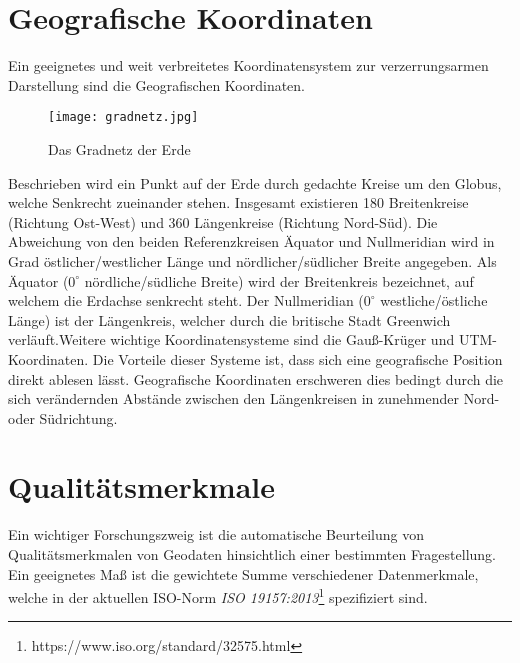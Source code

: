 \documentclass[11pt,fleqn]{book}
\begin{document}
\section{Geografische Koordinaten}
Ein geeignetes und weit verbreitetes Koordinatensystem zur verzerrungsarmen Darstellung sind die Geografischen Koordinaten. 

\begin{figure}[h]
\centering
\texttt{[image: gradnetz.jpg]}
\caption{Das Gradnetz der Erde}\label{gradnetz}
\end{figure}

Beschrieben wird ein Punkt auf der Erde durch gedachte Kreise um den Globus, welche Senkrecht zueinander stehen. Insgesamt existieren 180 Breitenkreise (Richtung Ost-West) und 360 Längenkreise (Richtung Nord-Süd). Die Abweichung von den beiden Referenzkreisen Äquator und Nullmeridian wird in Grad östlicher/westlicher Länge und nördlicher/südlicher Breite angegeben. Als Äquator ($0^\circ$ nördliche/südliche Breite) wird der Breitenkreis bezeichnet, auf welchem die Erdachse senkrecht steht. Der Nullmeridian ($0^\circ$ westliche/östliche Länge) ist der Längenkreis, welcher durch die britische Stadt Greenwich verläuft.\newline Weitere wichtige Koordinatensysteme sind die Gauß-Krüger und UTM-Koordinaten. Die Vorteile dieser Systeme ist, dass sich eine geografische Position direkt ablesen lässt. Geografische Koordinaten erschweren dies bedingt durch die sich verändernden Abstände zwischen den Längenkreisen in zunehmender Nord- oder Südrichtung.


\section{Qualitätsmerkmale}
Ein wichtiger Forschungszweig ist die automatische Beurteilung von Qualitätsmerkmalen von Geodaten hinsichtlich einer bestimmten Fragestellung.
Ein geeignetes Maß ist die gewichtete Summe verschiedener Datenmerkmale, welche in der aktuellen ISO-Norm \textit{ISO 19157:2013}\footnote{https://www.iso.org/standard/32575.html} spezifiziert sind.
\end{document}
